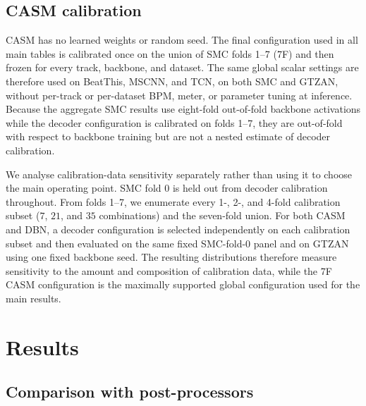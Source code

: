 \documentclass{article}
\begin{document}
\subsection{CASM calibration}
CASM has no learned weights or random seed. The final configuration used in all main tables is calibrated once on the union of SMC folds 1--7 (7F) and then frozen for every track, backbone, and dataset. The same global scalar settings are therefore used on BeatThis, MSCNN, and TCN, on both SMC and GTZAN, without per-track or per-dataset BPM, meter, or parameter tuning at inference. Because the aggregate SMC results use eight-fold out-of-fold backbone activations while the decoder configuration is calibrated on folds 1--7, they are out-of-fold with respect to backbone training but are not a nested estimate of decoder calibration.

We analyse calibration-data sensitivity separately rather than using it to choose the main operating point. SMC fold 0 is held out from decoder calibration throughout. From folds 1--7, we enumerate every 1-, 2-, and 4-fold calibration subset ($7$, $21$, and $35$ combinations) and the seven-fold union. For both CASM and DBN, a decoder configuration is selected independently on each calibration subset and then evaluated on the same fixed SMC-fold-0 panel and on GTZAN using one fixed backbone seed. The resulting distributions therefore measure sensitivity to the amount and composition of calibration data, while the 7F CASM configuration is the maximally supported global configuration used for the main results.

\section{Results}
\label{sec:results}

\subsection{Comparison with post-processors}
\end{document}
